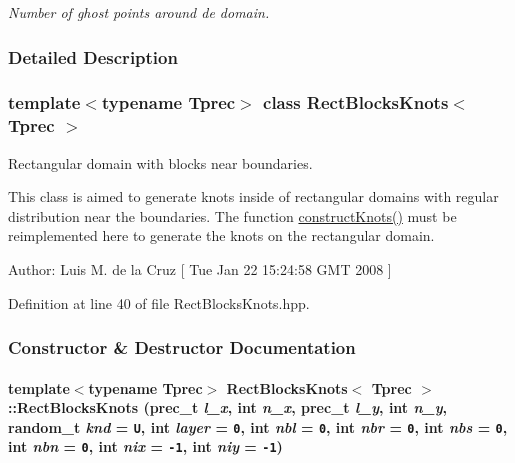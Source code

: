\begin{CompactItemize}
\begin{CompactList}\small\item\em Number of ghost points around de domain. \item\end{CompactList}\end{CompactItemize}


\subsubsection{Detailed Description}
\subsubsection*{template$<$typename Tprec$>$ class RectBlocksKnots$<$ Tprec $>$}

Rectangular domain with blocks near boundaries. 

This class is aimed to generate knots inside of rectangular domains with regular distribution near the boundaries. The function \hyperlink{classRectBlocksKnots_cd9a8af5b8a5a241d149ff0b1efb4318}{constructKnots()} must be reimplemented here to generate the knots on the rectangular domain. \begin{Desc}
\item[Author:]Luis M. de la Cruz \mbox{[} Tue Jan 22 15:24:58 GMT 2008 \mbox{]} \end{Desc}


Definition at line 40 of file RectBlocksKnots.hpp.

\subsubsection{Constructor \& Destructor Documentation}
\hypertarget{classRectBlocksKnots_ecfccc1adba95a40cafb189235884318}{
\paragraph[{RectBlocksKnots}]{\setlength{\rightskip}{0pt plus 5cm}template$<$typename Tprec$>$ {\bf RectBlocksKnots}$<$ Tprec $>$::{\bf RectBlocksKnots} (prec\_\-t {\em l\_\-x}, \/  int {\em n\_\-x}, \/  prec\_\-t {\em l\_\-y}, \/  int {\em n\_\-y}, \/  random\_\-t {\em knd} = {\tt U}, \/  int {\em layer} = {\tt 0}, \/  int {\em nbl} = {\tt 0}, \/  int {\em nbr} = {\tt 0}, \/  int {\em nbs} = {\tt 0}, \/  int {\em nbn} = {\tt 0}, \/  int {\em nix} = {\tt -1}, \/  int {\em niy} = {\tt -1})}\hfill}
\label{classRectBlocksKnots_ecfccc1adba95a40cafb189235884318}


